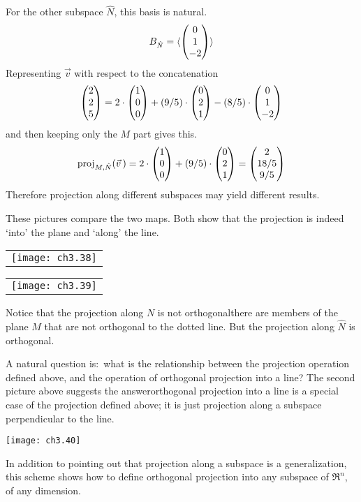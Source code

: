 \begin{example}
For the other subspace $\hat{N}$, this basis is natural. 
\begin{equation*}
  B_{\hat{N}}=\sequence{
                \colvec{0 \\ 1 \\ -2} }
\end{equation*}
Representing $\vec{v}$ with respect to the concatenation  
\begin{equation*}
  \colvec{2 \\ 2 \\ 5}=
  2\cdot\colvec{1 \\ 0 \\ 0}
  +(9/5)\cdot\colvec{0 \\ 2 \\ 1}
  -(8/5)\cdot\colvec{0 \\ 1 \\ -2}
\end{equation*}
and then keeping only the $M$ part gives this. 
\begin{equation*}
  \proj{\vec{v}\,}{M,\hat{N}}
  =
  2\cdot\colvec{1 \\ 0 \\ 0}
  +(9/5)\cdot\colvec{0 \\ 2 \\ 1}
  =\colvec{2 \\ 18/5 \\ 9/5}
\end{equation*}
Therefore projection along different subspaces may yield different results.

These pictures compare the two maps.
Both show that the projection is indeed `into' the plane and
`along' the line.
\begin{center}  \small
  \begin{tabular}{@{}c@{}}\texttt{[image: ch3.38]}\end{tabular}
  \qquad
  \begin{tabular}{@{}c@{}}\texttt{[image: ch3.39]}\end{tabular}
\end{center}
Notice that the projection along $N$ is not orthogonal\Dash there are
members of the plane $M$ that are not orthogonal to the dotted line.
But the projection along $\hat{N}$ is orthogonal. 
\end{example}

A natural question is:~what is the relationship between the projection 
operation defined above, and the operation of orthogonal projection
into a line? 
The second picture above suggests the answer\Dash orthogonal projection into
a line is a special case of the projection defined above; it is just 
projection along a subspace perpendicular to the line.
\begin{center}  \small
  \texttt{[image: ch3.40]}
\end{center}
In addition to pointing out that projection along a subspace is a 
generalization, this scheme shows how to define orthogonal projection into
any subspace of $\Re^n$, of any dimension. 

